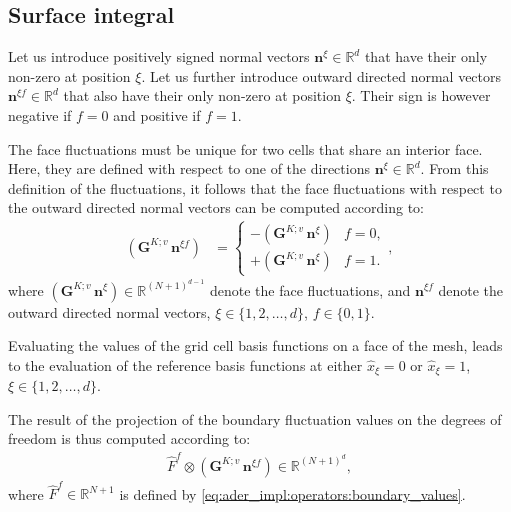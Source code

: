 \documentclass{scrreprt}
\theoremstyle{definition}
\theoremstyle{nonumberplain}
\renewcommand{\vec}[1]{{\textbf{#1}}}
\newcommand{\cell}{K}
\begin{document}
\subsection{Surface integral}
Let us introduce positively signed normal vectors $\vec{n}^{\xi}\in\mathbb{R}^d$
that have their only non-zero at position $\xi$.
Let us further introduce outward directed normal vectors $\vec{n}^{\xi
f}\in\mathbb{R}^d$ that also have their only non-zero at position $\xi$. Their
sign is however negative if $f=0$ and positive if $f=1$.

The face fluctuations must be unique for two cells that share an interior
face. Here, they are defined with respect to one of the directions
$\vec{n}^{\xi}\in\mathbb{R}^d$.
From this definition of the fluctuations, it follows that
the face fluctuations with respect to the outward directed
normal vectors can be computed according to:
\begin{align}
(\vec{G}^{\cell;v}\,\vec{n}^{\xi f})
&=
\begin{cases}
-(\vec{G}^{\cell;v}\,\vec{n}^{\xi}) & f=0, \\
+(\vec{G}^{\cell;v}\,\vec{n}^{\xi}) & f=1.
\end{cases},
\end{align}
where $(\vec{G}^{\cell;v}\,\vec{n}^{\xi})\in\mathbb{R}^{(N+1)^{d-1}}$
denote the face fluctuations, and $\vec{n}^{\xi f}$ denote the
outward directed normal vectors, $\xi\in\{1,2,\ldots,d\}$, $f\in\{0,1\}$.

Evaluating the values of the grid cell basis functions on a face of the mesh,
leads to the evaluation of the reference basis functions at
either $\hat{x}_\xi=0$ or $\hat{x}_\xi=1$, $\xi\in\{1,2,\ldots,d\}$.

The result of the projection of the boundary fluctuation values on the
degrees of freedom is thus computed according to:
\begin{align}
\hat{F}^f\otimes(\vec{G}^{\cell;v}\,\vec{n}^{\xi
f})\in\mathbb{R}^{(N+1)^d},
\end{align}
where $\hat{F}^f\in\mathbb{R}^{N+1}$ is defined
by \eqref{eq:ader_impl:operators:boundary_values}.
\end{document}
